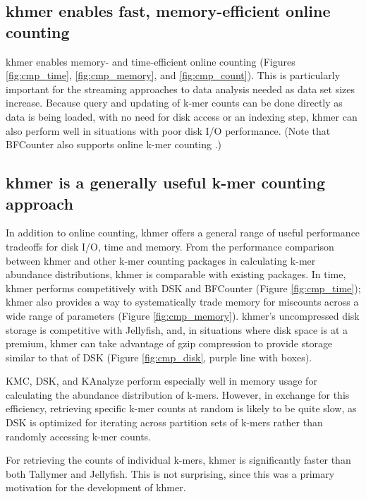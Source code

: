 \subsection{khmer enables fast, memory-efficient online counting}

khmer enables memory- and time-efficient online counting (Figures
\ref{fig:cmp_time}, \ref{fig:cmp_memory}, and \ref{fig:cmp_count}).
This is particularly important for the streaming approaches to data
analysis needed as data set sizes increase.  Because query and
updating of k-mer counts can be done directly as data is being loaded,
with no need for disk access or an indexing step, khmer can also
perform well in situations with poor disk I/O performance.  (Note that
BFCounter also supports online k-mer counting \cite{Melsted2011}.)


\subsection{khmer is a generally useful k-mer counting approach}

In addition to online counting, khmer offers a general range of useful
performance tradeoffs for disk I/O, time and memory.  From the
performance comparison between khmer and other k-mer counting packages
in calculating k-mer abundance distributions, khmer is comparable with
existing packages.  In time, khmer performs competitively with DSK and
BFCounter (Figure \ref{fig:cmp_time}); khmer also provides a way to
systematically trade memory for miscounts across a wide range of
parameters (Figure \ref{fig:cmp_memory}).  khmer's uncompressed disk
storage is competitive with Jellyfish, and, in situations where disk
space is at a premium, khmer can take advantage of gzip compression to
provide storage similar to that of DSK (Figure \ref{fig:cmp_disk},
purple line with boxes).

KMC, DSK, and KAnalyze perform especially well in memory usage for
calculating the abundance distribution of k-mers. However, in exchange
for this efficiency, retrieving specific k-mer counts at random is
likely to be quite slow, as DSK is optimized for iterating across
partition sets of k-mers rather than randomly accessing k-mer counts.

For retrieving the counts of individual k-mers, khmer is significantly
faster than both Tallymer and Jellyfish.  This is not surprising,
since this was a primary motivation for the development of khmer.

